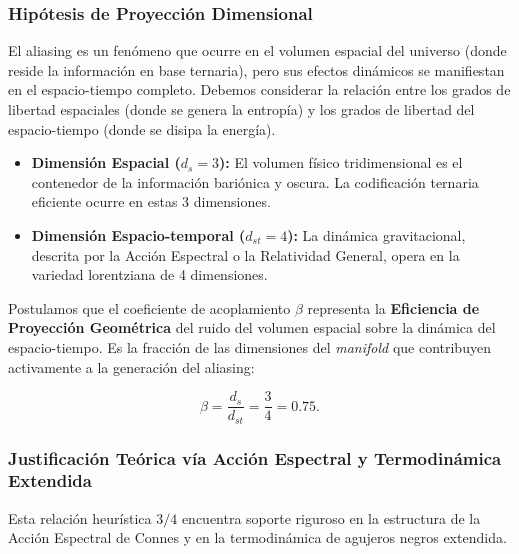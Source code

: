 \documentclass[12pt, a4paper]{article}
\theoremstyle{plain}
\theoremstyle{definition}
\begin{document}
\subsubsection{Hipótesis de Proyección Dimensional}

El aliasing es un fenómeno que ocurre en el volumen espacial del universo (donde reside la información en base ternaria), pero sus efectos dinámicos se manifiestan en el espacio-tiempo completo. Debemos considerar la relación entre los grados de libertad espaciales (donde se genera la entropía) y los grados de libertad del espacio-tiempo (donde se disipa la energía).

\begin{itemize}
    \item \textbf{Dimensión Espacial ($d_s = 3$):} El volumen físico tridimensional es el contenedor de la información bariónica y oscura. La codificación ternaria eficiente ocurre en estas 3 dimensiones.
    \item \textbf{Dimensión Espacio-temporal ($d_{st} = 4$):} La dinámica gravitacional, descrita por la Acción Espectral o la Relatividad General, opera en la variedad lorentziana de 4 dimensiones.
\end{itemize}

Postulamos que el coeficiente de acoplamiento $\beta$ representa la \textbf{Eficiencia de Proyección Geométrica} del ruido del volumen espacial sobre la dinámica del espacio-tiempo. Es la fracción de las dimensiones del \textit{manifold} que contribuyen activamente a la generación del aliasing:

\begin{equation}
\beta = \frac{d_s}{d_{st}} = \frac{3}{4} = 0.75.
\label{eq:beta_projection}
\end{equation}

\subsubsection{Justificación Teórica vía Acción Espectral y Termodinámica Extendida}

Esta relación heurística $3/4$ encuentra soporte riguroso en la estructura de la Acción Espectral de Connes y en la termodinámica de agujeros negros extendida.
\end{document}
